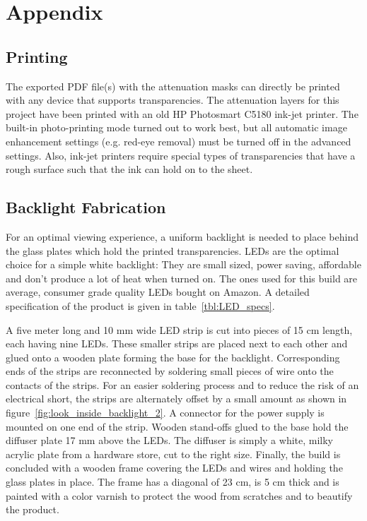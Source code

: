 \chapter{Appendix}
\label{chp:appendix}

\section{Printing}
\label{sec:Printing}

The exported PDF file(s) with the attenuation masks can directly be printed with any device that supports transparencies.
The attenuation layers for this project have been printed with an old HP Photosmart C5180 ink-jet printer.
The built-in photo-printing mode turned out to work best, but all automatic image enhancement settings (e.g. red-eye removal) must be turned off in the advanced settings.
Also, ink-jet printers require special types of transparencies that have a rough surface such that the ink can hold on to the sheet.

\section{Backlight Fabrication}
\label{sec:backlight_fabrication}

For an optimal viewing experience, a uniform backlight is needed to place behind the glass plates which hold the printed transparencies.
LEDs are the optimal choice for a simple white backlight: They are small sized, power saving, affordable and don't produce a lot of heat when turned on.
The ones used for this build are average, consumer grade quality LEDs bought on Amazon.
A detailed specification of the product is given in table~\ref{tbl:LED_specs}.

A five meter long and 10 mm wide LED strip is cut into pieces of 15 cm length, each having nine LEDs.
These smaller strips are placed next to each other and glued onto a wooden plate forming the base for the backlight.
Corresponding ends of the strips are reconnected by soldering small pieces of wire onto the contacts of the strips.
For an easier soldering process and to reduce the risk of an electrical short, the strips are alternately offset by a small amount as shown in figure~\ref{fig:look_inside_backlight_2}.
A connector for the power supply is mounted on one end of the strip.
Wooden stand-offs glued to the base hold the diffuser plate 17 mm above the LEDs.
The diffuser is simply a white, milky acrylic plate from a hardware store, cut to the right size.
Finally, the build is concluded with a wooden frame covering the LEDs and wires and holding the glass plates in place.
The frame has a diagonal of 23 cm, is 5 cm thick and is painted with a color varnish to protect the wood from scratches and to beautify the product.

